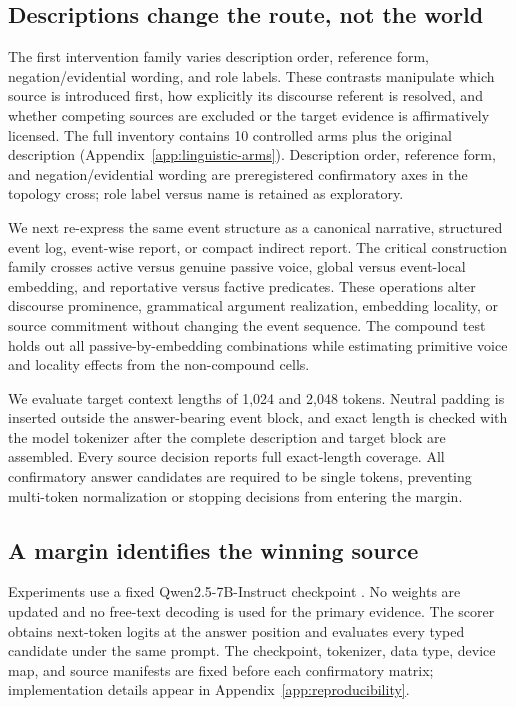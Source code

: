 \subsection{Descriptions change the route, not the world}

The first intervention family varies description order, reference form,
negation/evidential wording, and role labels. These contrasts manipulate which
source is introduced first, how explicitly its discourse referent is resolved,
and whether competing sources are excluded or the target evidence is
affirmatively licensed. The full inventory contains 10 controlled arms plus the
original description (Appendix~\ref{app:linguistic-arms}). Description order,
reference form, and negation/evidential wording are preregistered confirmatory
axes in the topology cross; role label versus name is retained as exploratory.

We next re-express the same event structure as a canonical narrative,
structured event log, event-wise report, or compact indirect report. The
critical construction family crosses active versus genuine passive voice,
global versus event-local embedding, and reportative versus factive predicates.
These operations alter discourse prominence, grammatical argument realization,
embedding locality, or source commitment without changing the event sequence.
The compound test holds out all passive-by-embedding combinations while
estimating primitive voice and locality effects from the non-compound cells.

We evaluate target context lengths of 1,024 and 2,048 tokens. Neutral padding is
inserted outside the answer-bearing event block, and exact length is checked
with the model tokenizer after the complete description and target block are
assembled. Every source decision reports full exact-length coverage. All
confirmatory answer candidates are required to be single tokens, preventing
multi-token normalization or stopping decisions from entering the margin.

\subsection{A margin identifies the winning source}

Experiments use a fixed Qwen2.5-7B-Instruct checkpoint
\citep{qwen2024qwen25}. No weights are updated and no free-text decoding is
used for the primary evidence. The scorer obtains next-token logits at the
answer position and evaluates every typed candidate under the same prompt. The
checkpoint, tokenizer, data type, device map, and source manifests are fixed
before each confirmatory matrix; implementation details appear in
Appendix~\ref{app:reproducibility}.

